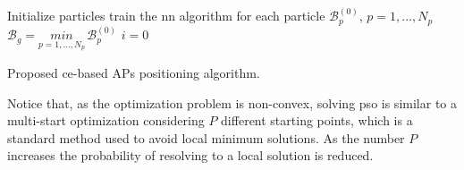 \documentclass[conference,final]{IEEEtran}
\begin{document}
 \begin{algorithm}[b!]

\small

  Initialize particles\;
  train the \ac{nn} algorithm for each particle\;
  $\mathcal{B}_p^{(0)}$, $p=1,...,N_p$\;
  $\mathcal{B}_g=\underset{p=1,...,N_p}{min} \, \mathcal{B}_p^{(0)}$\;
  $i = 0$\;

      
\caption{Proposed \ac{ce}-based APs positioning algorithm.}
 \end{algorithm}      



      
    

Notice that, as the optimization problem is non-convex, solving \ac{pso} is similar to a multi-start optimization considering $P$ different starting points, which is a standard method used to avoid local minimum solutions. As the number $P$ increases the probability of resolving to a local solution is reduced.
\end{document}
